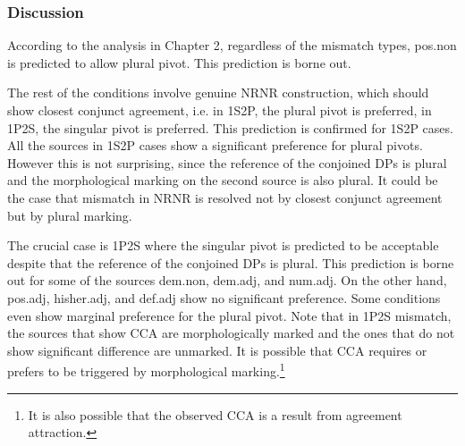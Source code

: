 \documentclass[
  11pt          %
  ,letterpaper  %
  ,center       %
  ,noupper      %
  ]{uconnthesis2}
\begin{document}

\subsubsection{Discussion}

According to the analysis in Chapter 2, regardless of the mismatch types, pos.non is predicted to allow plural pivot. This prediction is borne out. 

The rest of the conditions involve genuine NRNR construction, which should show closest conjunct agreement, i.e. in 1S2P, the plural pivot is preferred, in 1P2S, the singular pivot is preferred. This prediction is confirmed for 1S2P cases. All the sources in 1S2P cases show a significant preference for plural pivots. However this is not surprising, since the reference of the conjoined DPs is plural and the morphological marking on the second source is also plural. It could be the case that mismatch in NRNR is resolved not by closest conjunct agreement but by plural marking. 

The crucial case is 1P2S where the singular pivot is predicted to be acceptable despite that the reference of the conjoined DPs is plural. This prediction is borne out for some of the sources dem.non, dem.adj, and num.adj. On the other hand, pos.adj, hisher.adj, and def.adj show no significant preference. Some conditions even show marginal preference for the plural pivot. Note that in 1P2S mismatch, the sources that show CCA are morphologically marked and the ones that do not show significant difference are unmarked. It is possible that CCA requires or prefers to be triggered by morphological marking.\footnote{It is also possible that the observed CCA is a result from agreement attraction.}
\end{document}
